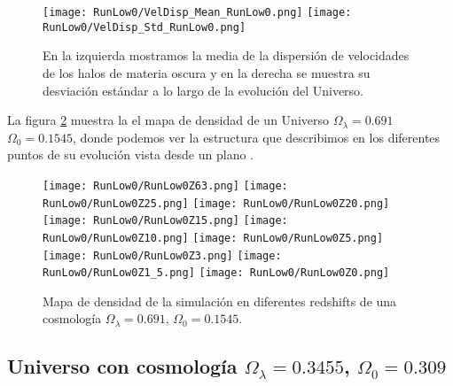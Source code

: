 \begin{figure}[H]
    \centering
    \texttt{[image: RunLow0/VelDisp\_Mean\_RunLow0.png]}
    \texttt{[image: RunLow0/VelDisp\_Std\_RunLow0.png]}
    \caption[Media y desviación estándar de la dispersión de velocidades]{\footnotesize En la izquierda mostramos la media de la dispersión de velocidades de los halos de materia oscura y en la derecha se muestra su desviación estándar a lo largo de la evolución del Universo.}
    \label{fig:Low0-VelDispStats}
\end{figure}

La figura \ref{fig:Low0-DensityMap} muestra la el mapa de densidad de un Universo $\Omega_\lambda = 0.691$ $\Omega_0 = 0.1545$, donde podemos ver la estructura que describimos  en los diferentes puntos de su evolución vista desde un plano .
\begin{figure}[H]
    \centering

    \texttt{[image: RunLow0/RunLow0Z63.png]}   %
    \texttt{[image: RunLow0/RunLow0Z25.png]}   %
    \texttt{[image: RunLow0/RunLow0Z20.png]}   %
    \\
    \texttt{[image: RunLow0/RunLow0Z15.png]}   %
    \texttt{[image: RunLow0/RunLow0Z10.png]}   %
    \texttt{[image: RunLow0/RunLow0Z5.png]}    %
    \\
    \texttt{[image: RunLow0/RunLow0Z3.png]}    %
    \texttt{[image: RunLow0/RunLow0Z1\_5.png]}  %
    \texttt{[image: RunLow0/RunLow0Z0.png]}    %
    \caption[Mapa de densidad de un Universo en en diferentes redshift]{ \footnotesize Mapa de densidad de la simulación en diferentes redshifts de una cosmología $\Omega_\lambda = 0.691$, $\Omega_0 = 0.1545$. }
    \label{fig:Low0-DensityMap}
\end{figure}


\subsection{Universo con cosmología \texorpdfstring{$\Omega_\lambda = 0.3455$, $\Omega_0 = 0.309$ }{Omega lambda = 0.3455, Omega 0 = 0.309}  }

